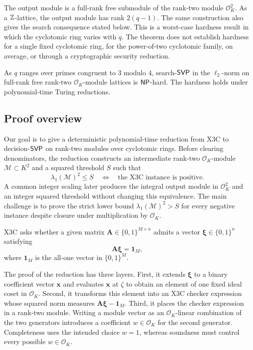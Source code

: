 The output module is a full-rank free submodule of the rank-two
module $\mathcal{O}_K^2$.  As a $\mathbb Z$-lattice, the output module has
rank $2(q-1)$.  The same construction also gives the search consequence
stated below.  This is a worst-case hardness result in which the
cyclotomic ring varies with $q$.  The theorem does not establish hardness for a
single fixed cyclotomic ring, for the power-of-two cyclotomic family, on
average, or through a cryptographic security reduction.

\begin{corollary}
\label{cor:search-hardness}
As $q$ ranges over primes congruent to $3$ modulo $4$,
search-$\mathsf{SVP}$ in the $\ell_2$-norm on full-rank free rank-two
$\mathcal{O}_K$-module lattices is $\mathsf{NP}$-hard.  The hardness holds under
polynomial-time Turing reductions.
\end{corollary}

\subsection{Proof overview}
Our goal is to give a deterministic polynomial-time reduction from
X3C to decision-$\mathsf{SVP}$ on rank-two modules over
cyclotomic rings.  Before clearing denominators, the reduction constructs an
intermediate rank-two $\mathcal{O}_K$-module $\mathcal M\subset K^2$ and a
squared threshold $S$ such that
\[
 \lambda_1(\mathcal M)^2\le S
 \quad\Longleftrightarrow\quad
 \text{the X3C instance is positive}.
\]
A common integer scaling later produces the integral output module in
$\mathcal{O}_K^2$ and an integer squared threshold without changing this
equivalence.  The main challenge is to prove the strict lower bound
$\lambda_1(\mathcal M)^2>S$ for every negative instance despite closure under
multiplication by $\mathcal{O}_K$.

X3C asks whether a given matrix
$\mathbf A\in\{0,1\}^{M\times n}$ admits a vector
$\boldsymbol\xi\in\{0,1\}^n$ satisfying
\begin{equation}
\label{eq:intro-x3c}
 \mathbf A\boldsymbol\xi=\mathbf1_M,
\end{equation}
where $\mathbf1_M$ is the all-one vector in $\{0,1\}^M$.

The proof of the reduction has three layers.  First, it extends
$\boldsymbol\xi$ to a binary coefficient vector $\mathbf x$ and evaluates
$\mathbf x$ at $\zeta$ to obtain an element of one fixed ideal coset in
$\mathcal{O}_K$.  Second, it transforms this element into an X3C checker
expression whose squared norm measures
$\mathbf A\boldsymbol\xi-\mathbf1_M$.  Third, it places the checker expression
in a rank-two module.  Writing a module vector as an
$\mathcal{O}_K$-linear combination of the two generators introduces a
coefficient $w\in\mathcal{O}_K$ for the second generator.  Completeness uses
the intended choice $w=1$, whereas soundness must control every possible
$w\in\mathcal{O}_K$.

